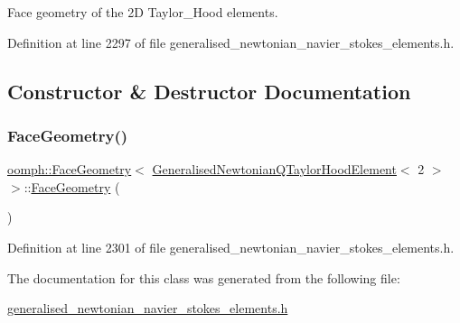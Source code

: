 Face geometry of the 2D Taylor\+\_\+\+Hood elements. 

Definition at line 2297 of file generalised\+\_\+newtonian\+\_\+navier\+\_\+stokes\+\_\+elements.\+h.



\subsection{Constructor \& Destructor Documentation}
\mbox{\label{classoomph_1_1FaceGeometry_3_01GeneralisedNewtonianQTaylorHoodElement_3_012_01_4_01_4_a14890ff88480ec042be90f44f8abbf50}} 
\subsubsection{\texorpdfstring{Face\+Geometry()}{FaceGeometry()}}
{\footnotesize\ttfamily \hyperlink{classoomph_1_1FaceGeometry}{oomph\+::\+Face\+Geometry}$<$ \hyperlink{classoomph_1_1GeneralisedNewtonianQTaylorHoodElement}{Generalised\+Newtonian\+Q\+Taylor\+Hood\+Element}$<$ 2 $>$ $>$\+::\hyperlink{classoomph_1_1FaceGeometry}{Face\+Geometry} (\begin{DoxyParamCaption}{ }\end{DoxyParamCaption})\hspace{0.3cm}{\ttfamily [inline]}}



Definition at line 2301 of file generalised\+\_\+newtonian\+\_\+navier\+\_\+stokes\+\_\+elements.\+h.



The documentation for this class was generated from the following file\+:\begin{DoxyCompactItemize}
\item 
\hyperlink{generalised__newtonian__navier__stokes__elements_8h}{generalised\+\_\+newtonian\+\_\+navier\+\_\+stokes\+\_\+elements.\+h}\end{DoxyCompactItemize}
